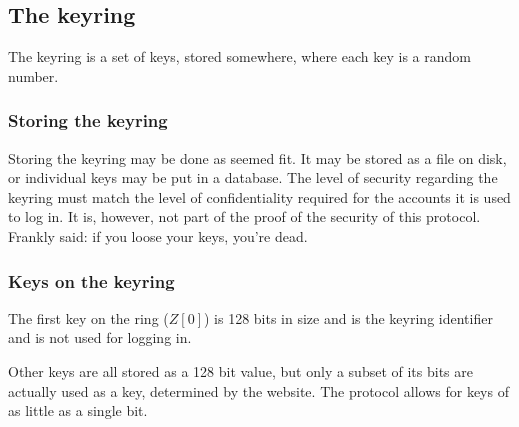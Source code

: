 \subsection{The keyring}
The keyring is a set of keys,
stored somewhere,
where each key is a random number.
\subsubsection{Storing the keyring}
Storing the keyring may be done as seemed fit.
It may be stored as a file on disk,
or individual keys may be put in a database.
The level of security regarding the keyring must match the level of confidentiality required for the accounts it is used to log in.
It is,
however,
not part of the proof of the security of this protocol.
Frankly said:
if you loose your keys,
you're dead.
\subsubsection{Keys on the keyring}
The first key on the ring
($Z[0]$)
is 128 bits in size and is the keyring identifier and is not used for logging in.
\par
Other keys are all stored as a 128 bit value,
but only a subset of its bits are actually used as a key,
determined by the website.
The protocol allows for keys of as little as a single bit.
